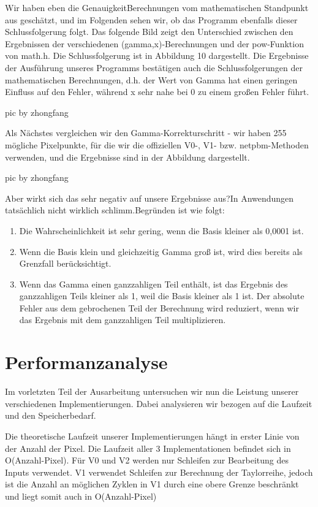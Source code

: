 \documentclass[course=erap]{aspdoc}
\begin{document}
\par
Wir haben eben die GenauigkeitBerechnungen vom mathematischen Standpunkt aus geschätzt, und im Folgenden sehen wir, ob das Programm ebenfalls dieser Schlussfolgerung folgt. Das folgende Bild zeigt den Unterschied zwischen den Ergebnissen der verschiedenen (gamma,x)-Berechnungen und der pow-Funktion von math.h. Die Schlussfolgerung ist in Abbildung 10 dargestellt. Die Ergebnisse der Ausführung unseres Programms bestätigen auch die Schlussfolgerungen der mathematischen Berechnungen, d.h. der Wert von Gamma hat einen geringen Einfluss auf den Fehler, während x sehr nahe bei 0 zu einem großen Fehler führt.

\par
pic by zhongfang

\par
Als Nächstes vergleichen wir den Gamma-Korrekturschritt - wir haben 255 mögliche Pixelpunkte, für die wir die offiziellen V0-, V1- bzw. netpbm-Methoden verwenden, und die Ergebnisse sind in der Abbildung dargestellt.

\par
pic by zhongfang

\par
Aber wirkt sich das sehr negativ auf unsere Ergebnisse aus?In Anwendungen tatsächlich nicht wirklich schlimm.Begründen ist wie folgt:
\begin{enumerate}
\item Die Wahrscheinlichkeit ist sehr gering, wenn die Basis kleiner als 0,0001 ist.
\item Wenn die Basis klein und gleichzeitig Gamma groß ist, wird dies bereits als Grenzfall berücksichtigt.
\item Wenn das Gamma einen ganzzahligen Teil enthält, ist das Ergebnis des ganzzahligen Teils kleiner als 1, weil die Basis kleiner als 1 ist. Der absolute Fehler aus dem gebrochenen Teil der Berechnung wird reduziert, wenn wir das Ergebnis mit dem ganzzahligen Teil multiplizieren.
\end{enumerate}


\section{Performanzanalyse}
\par
Im vorletzten Teil der Ausarbeitung untersuchen wir nun die Leistung unserer verschiedenen Implementierungen. Dabei analysieren wir bezogen auf die Laufzeit und den Speicherbedarf.

\par
Die theoretische Laufzeit unserer Implementierungen hängt in erster Linie von der Anzahl der Pixel. Die Laufzeit aller 3 Implementationen befindet sich in O(Anzahl-Pixel). Für V0 und V2 werden nur Schleifen zur Bearbeitung des Inputs verwendet. V1 verwendet Schleifen zur Berechnung der Taylorreihe, jedoch ist die Anzahl an möglichen Zyklen in V1 durch eine obere Grenze beschränkt und liegt somit auch in O(Anzahl-Pixel)
\end{document}
